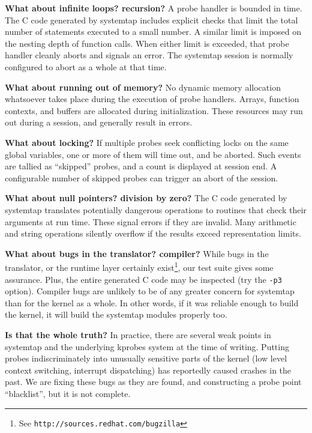 \documentclass{article}
\renewcommand{\nomenclature}[2]{}
\begin{document}
\begin{description}
\item{\bf What about infinite loops?  recursion?} A probe handler is
bounded in time.  The C code generated by systemtap includes explicit
checks that limit the total number of statements executed to a small
number.  A similar limit is imposed on the nesting depth of function
calls.  When either limit is exceeded, that probe handler cleanly
aborts and signals an error.  The systemtap session is normally
configured to abort as a whole at that time.

\item{\bf What about running out of memory?}  No dynamic memory
allocation whatsoever takes place during the execution of probe
handlers.  Arrays, function contexts, and buffers are allocated during
initialization.  These resources may run out during a session, and
generally result in errors.

\item{\bf What about locking?}  If multiple probes seek conflicting
locks on the same global variables, one or more of them will time out,
and be aborted.  Such events are tallied as ``skipped'' probes, and a
count is displayed at session end.  A configurable number of skipped
probes can trigger an abort of the session.

\item{\bf What about null pointers? division by zero?}  The C code
generated by systemtap translates potentially dangerous operations to
routines that check their arguments at run time.  These signal errors
if they are invalid.  Many arithmetic and string operations silently
overflow if the results exceed representation limits.

\item{\bf What about bugs in the translator?  compiler?}  While bugs
in the translator, or the runtime layer certainly exist\footnote{See
\tt http://sources.redhat.com/bugzilla}, our test suite gives some
assurance.  Plus, the entire generated C code may be inspected (try
the \verb+-p3+ option).  Compiler bugs are unlikely to be of any
greater concern for systemtap than for the kernel as a whole.  In
other words, if it was reliable enough to build the kernel, it will
build the systemtap modules properly too.

\item{\bf Is that the whole truth?}  In practice, there are several
weak points in systemtap and the underlying kprobes system at the time
of writing.  Putting probes indiscriminately into unusually sensitive
parts of the kernel (low level context switching, interrupt
dispatching) has reportedly caused crashes in the past.  We are
fixing these bugs as they are found, and
constructing a probe point ``blacklist'', but it is not complete.
\nomenclature{blacklist}{A list of probe point patterns encoded into
the translator or the kernel, where probing is prohibited for safety
reasons.}  \nomenclature{kprobes}{A breakpoint dispatching system for
dynamic kernel probes, used by systemtap to implement some families of
probe points.}

\end{description}
\end{document}
